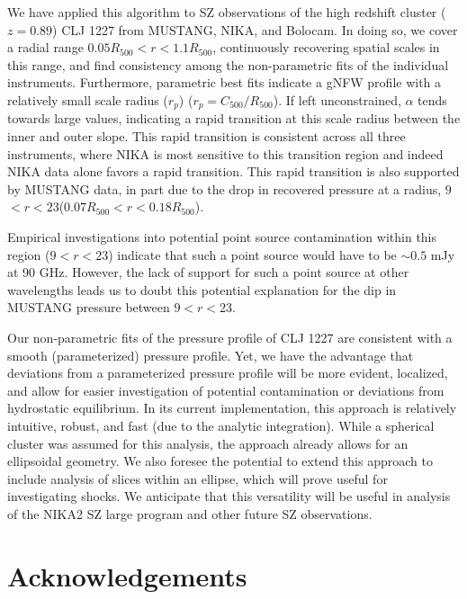 \documentclass[twocolumn,traditabstract]{aa}
\begin{document}
We have applied this algorithm to SZ observations of the high redshift cluster ($z = 0.89$)
CLJ 1227 from MUSTANG, NIKA, and Bolocam. In doing so, we cover a radial range
$0.05 R_{500} < r < 1.1 R_{500}$, continuously recovering spatial scales in this range,
and find consistency among the non-parametric fits of the individual instruments. Furthermore,
parametric best fits indicate a gNFW profile with a relatively small scale radius ($r_p$)
($r_p = C_{500}/R_{500}$). If left unconstrained, $\alpha$ tends towards large values, indicating
a rapid transition at this scale radius between the inner and outer slope. This rapid transition
is consistent across all three instruments, where NIKA is most sensitive to this transition
region and indeed NIKA data alone favors a rapid transition. This rapid transition is also
supported by MUSTANG data, in part due to the drop in recovered pressure at a radius,
$9$\asecs $< r < 23$\asec ($0.07 R_{500} < r < 0.18 R_{500}$).

Empirical investigations into potential point source contamination within this region ($9$\asec $< r < 23$\asec)
indicate that such a point source would have to be $\sim 0.5$ mJy at 90 GHz.
However, the lack of support for such a point source at other wavelengths leads us to doubt this potential explanation for
the dip in MUSTANG pressure between $9$\asecs $< r < 23$\asec.

Our non-parametric fits of the pressure profile of CLJ 1227 are consistent with a smooth (parameterized) pressure profile.
Yet, we have the advantage that deviations from a parameterized pressure profile will be more evident, localized, and
allow for easier investigation of potential contamination or deviations from hydrostatic equilibrium. In its current implementation,
this approach is relatively intuitive, robust, and fast (due to the analytic integration). While a spherical cluster was assumed
for this analysis, the approach already allows for an ellipsoidal geometry. We also foresee the potential to extend this approach
to include analysis of slices within an ellipse, which will prove useful for investigating shocks. We anticipate that this
versatility will be useful in analysis of the NIKA2 SZ large program \citet{comis2016} and other future SZ observations.


\section*{Acknowledgements}
\end{document}
